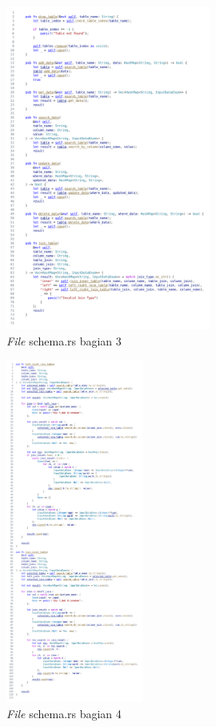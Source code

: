 \begin{figure}[H]
  \centering{}
	\includegraphics[width=0.6\textwidth]{gambar/lampiran/file-schema-3.png}
  \caption{\emph{File} schema.rs bagian 3}
\end{figure}

\begin{figure}[H]
  \centering{}
	\includegraphics[width=0.4\textwidth]{gambar/lampiran/file-schema-4.png}
  \caption{\emph{File} schema.rs bagian 4}
\end{figure}


